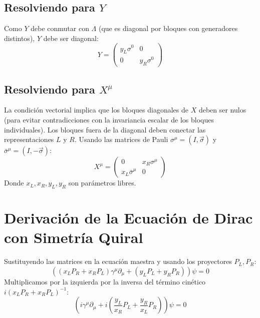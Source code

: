 \subsection{Resolviendo para $Y$}
Como $Y$ debe conmutar con $\Lambda$ (que es diagonal por bloques con generadores distintos), $Y$ debe ser diagonal:
\begin{equation}
    Y = \begin{pmatrix} y_L \sigma^0 & 0 \\ 0 & y_R \sigma^0 \end{pmatrix}
\end{equation}

\subsection{Resolviendo para $X^\mu$}
La condición vectorial implica que los bloques diagonales de $X$ deben ser nulos (para evitar contradicciones con la invariancia escalar de los bloques individuales). Los bloques fuera de la diagonal deben conectar las representaciones $L$ y $R$. Usando las matrices de Pauli $\sigma^\mu = (I, \vec{\sigma})$ y $\bar{\sigma}^\mu = (I, -\vec{\sigma})$:
\begin{equation}
    X^\mu = \begin{pmatrix} 0 & x_R \sigma^\mu \\ x_L \bar{\sigma}^\mu & 0 \end{pmatrix}
\end{equation}
Donde $x_L, x_R, y_L, y_R$ son parámetros libres.

\section{Derivación de la Ecuación de Dirac con Simetría Quiral}

Sustituyendo las matrices en la ecuación maestra y usando los proyectores $P_L, P_R$:
\begin{equation}
    ((x_L P_R + x_R P_L)\gamma^\mu \partial_\mu + (y_L P_L + y_R P_R))\psi = 0
\end{equation}
Multiplicamos por la izquierda por la inversa del término cinético $i(x_L P_R + x_R P_L)^{-1}$:
\begin{equation}
    \left( i\gamma^\mu \partial_\mu + i \left( \frac{y_L}{x_R} P_L + \frac{y_R}{x_L} P_R \right) \right)\psi = 0
\end{equation}

